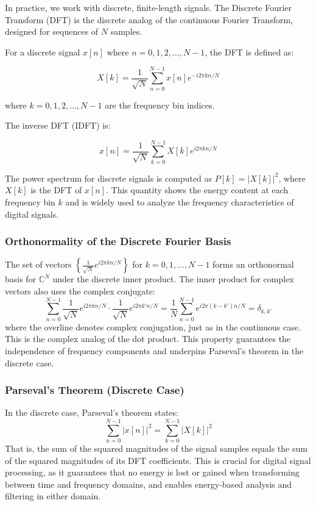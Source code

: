 \documentclass[11pt,a4paper]{article}
\begin{document}
In practice, we work with discrete, finite-length signals. The Discrete Fourier Transform (DFT) is the discrete analog of the continuous Fourier Transform, designed for sequences of $N$ samples.

For a discrete signal $x[n]$ where $n = 0, 1, 2, \ldots, N-1$, the DFT is defined as:

\begin{equation}
X[k] = \frac{1}{\sqrt{N}} \sum_{n=0}^{N-1} x[n] e^{-i 2\pi k n / N}
\end{equation}

where $k = 0, 1, 2, \ldots, N-1$ are the frequency bin indices.

The inverse DFT (IDFT) is:

\begin{equation}
x[n] = \frac{1}{\sqrt{N}} \sum_{k=0}^{N-1} X[k] e^{i 2\pi k n / N}
\end{equation}

The power spectrum for discrete signals is computed as $P[k] = |X[k]|^2$, where $X[k]$ is the DFT of $x[n]$. This quantity shows the energy content at each frequency bin $k$ and is widely used to analyze the frequency characteristics of digital signals.

\subsubsection*{Orthonormality of the Discrete Fourier Basis}
The set of vectors $\left\{\frac{1}{\sqrt{N}} e^{i2\pi k n/N}\right\}$ for $k=0,1,\ldots,N-1$ forms an orthonormal basis for $\mathbb{C}^N$ under the discrete inner product. The inner product for complex vectors also uses the complex conjugate:
\begin{equation}
\sum_{n=0}^{N-1} \frac{1}{\sqrt{N}} e^{i2\pi k n/N} \cdot \overline{\frac{1}{\sqrt{N}} e^{i2\pi k' n/N}} = \frac{1}{N} \sum_{n=0}^{N-1} e^{i2\pi (k-k') n/N} = \delta_{k,k'}
\end{equation}
where the overline denotes complex conjugation, just as in the continuous case. This is the complex analog of the dot product. This property guarantees the independence of frequency components and underpins Parseval's theorem in the discrete case.

\subsubsection*{Parseval's Theorem (Discrete Case)}
In the discrete case, Parseval's theorem states:
\begin{equation}
\sum_{n=0}^{N-1} |x[n]|^2 = \sum_{k=0}^{N-1} |X[k]|^2
\end{equation}
That is, the sum of the squared magnitudes of the signal samples equals the sum of the squared magnitudes of its DFT coefficients. This is crucial for digital signal processing, as it guarantees that no energy is lost or gained when transforming between time and frequency domains, and enables energy-based analysis and filtering in either domain.
\end{document}
